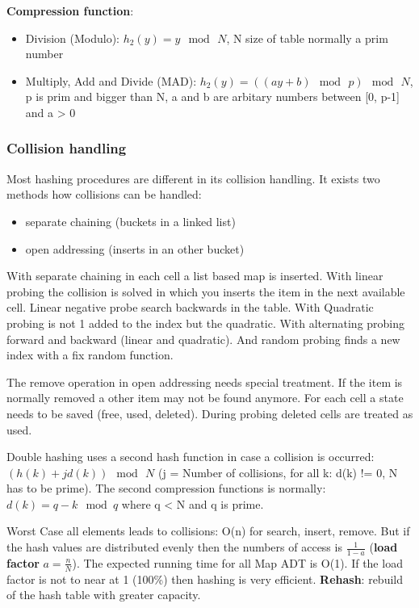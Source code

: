 \documentclass[11pt,twoside,landscape]{article}
\begin{document}
\begin{multicols}{2}
\textbf{Compression function}:
\begin{itemize}
\item Division (Modulo): \(h_2(y) = y \mod \, N\), N size of table normally a prim number
\item Multiply, Add and Divide (MAD): \(h_2(y) = ((ay + b) \mod \, p) \mod \, N\), p is prim and bigger than N, a and b are arbitary numbers between [0, p-1] and a > 0
\end{itemize}


\subsubsection*{Collision handling}
\label{sec:orgbe363f4}
Most hashing procedures are different in its collision handling. It exists two methods how collisions can be handled:
\begin{itemize}
\item separate chaining (buckets in a linked list)
\item open addressing (inserts in an other bucket)
\end{itemize}

With separate chaining in each cell a list based map is inserted. With linear probing the collision is solved in which you inserts the item in the next available cell. Linear negative probe search backwards in the table. With Quadratic probing is not 1 added to the index but the quadratic. With alternating probing forward and backward (linear and quadratic). And random probing finds a new index with a fix random function.

The remove operation in open addressing needs special treatment. If the item is normally removed a other item may not be found anymore. For each cell a state needs to be saved (free, used, deleted). During probing deleted cells are treated as used.

Double hashing uses a second hash function in case a collision is occurred: \((h(k) + jd(k)) \mod \, N\) (j = Number of collisions, for all k: d(k) != 0, N has to be prime). The second compression functions is normally: \(d(k) = q -k \mod q\) where q < N and q is prime.


Worst Case all elements leads to collisions: O(n) for search, insert, remove. But if the hash values are distributed evenly then the numbers of access is \(\frac{1}{1-a}\) (\textbf{load factor} \(a = \frac{n}{N}\)). The expected running time for all Map ADT is O(1). If the load factor is not to near at 1 (100\%) then hashing is very efficient. \textbf{Rehash}: rebuild of the hash table with greater capacity.


\end{multicols}
\end{document}
